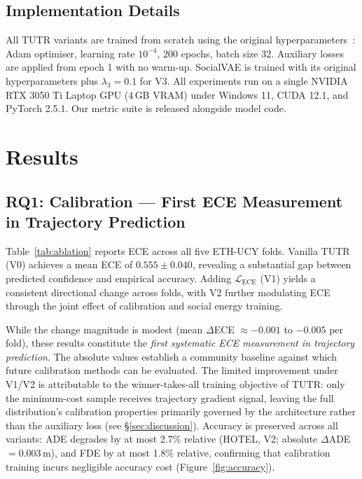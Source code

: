\subsection{Implementation Details}
\label{sec:exp:impl}

All TUTR variants are trained from scratch using the original
hyperparameters~\cite{shi2023tutr}: Adam optimiser, learning rate \(10^{-4}\),
200 epochs, batch size 32. Auxiliary losses are applied from epoch 1 with no
warm-up. SocialVAE is trained with its original hyperparameters plus
\(\lambda_3 = 0.1\) for V3. All experiments run on a single NVIDIA RTX 3050 Ti
Laptop GPU (4\,GB VRAM) under Windows 11, CUDA 12.1, and PyTorch 2.5.1.
Our metric suite is released alongside model code.



\section{Results}
\label{sec:results}

\subsection{RQ1: Calibration --- First ECE Measurement in Trajectory Prediction}
\label{sec:results:rq1}

Table~\ref{tab:ablation} reports ECE across all five ETH-UCY folds.
Vanilla TUTR (V0) achieves a mean ECE of \(0.555 \pm 0.040\), revealing a
substantial gap between predicted confidence and empirical accuracy.
Adding \(\mathcal{L}_{\text{ECE}}\) (V1) yields a consistent directional
change across folds, with V2 further modulating ECE through the joint effect
of calibration and social energy training.

While the change magnitude is modest (mean \(\Delta\)ECE \(\approx -0.001\)
to \(-0.005\) per fold), these results constitute the \emph{first systematic
ECE measurement in trajectory prediction}. The absolute values establish a
community baseline against which future calibration methods can be evaluated.
The limited improvement under V1/V2 is attributable to the winner-takes-all
training objective of TUTR: only the minimum-cost sample receives trajectory
gradient signal, leaving the full distribution's calibration properties
primarily governed by the architecture rather than the auxiliary loss
(see \S\ref{sec:discussion}).
Accuracy is preserved across all variants: ADE degrades by at most 2.7\%
relative (HOTEL, V2; absolute \(\Delta\)ADE \(= 0.003\)\,m), and FDE by at
most 1.8\% relative, confirming that calibration training incurs negligible
accuracy cost (Figure~\ref{fig:accuracy}).

